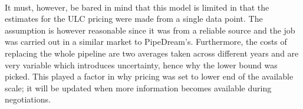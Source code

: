\documentclass[11pt]{article}		%
\begin{document}
	            \\
                \hspace*{3ex}It must, however, be bared in mind that this model is limited in that the estimates for the ULC pricing were made from a single data point. The assumption is however reasonable since it was from a reliable source and the job was carried out in a similar market to PipeDream’s. Furthermore, the costs of replacing the whole pipeline are two averages taken across different years and are very variable which introduces uncertainty, hence why the lower bound was picked. This played a factor in why pricing was set to lower end of the available scale; it will be updated when more information becomes available during negotiations.
                
\end{document}
